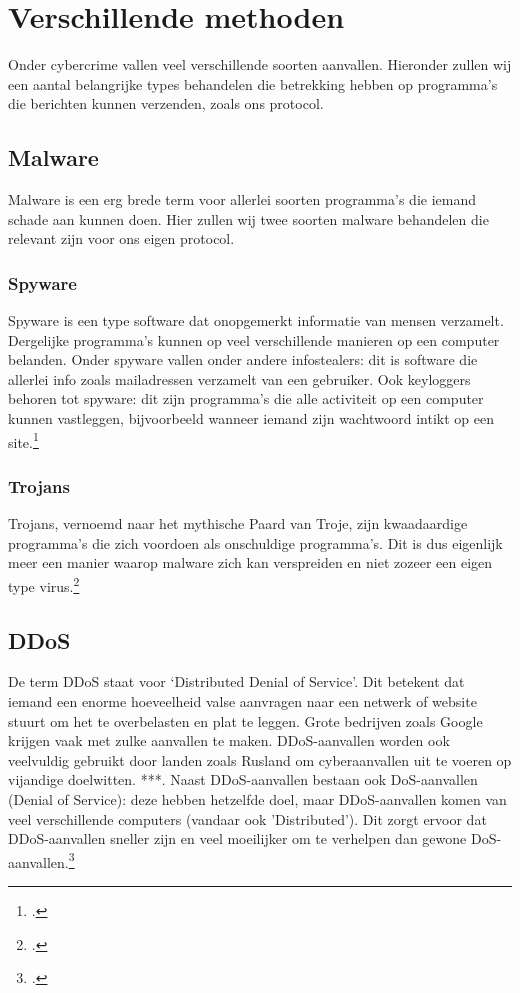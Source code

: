 \documentclass{report} %
\begin{document}
\section{Verschillende methoden}
Onder cybercrime vallen veel verschillende soorten aanvallen. Hieronder zullen wij een aantal belangrijke types behandelen die betrekking hebben op programma's die berichten kunnen verzenden, zoals ons protocol.

\subsection{Malware}
Malware is een erg brede term voor allerlei soorten programma's die iemand schade aan kunnen doen. Hier zullen wij twee soorten malware behandelen die relevant zijn voor ons eigen protocol.
\subsubsection{Spyware}
Spyware is een type software dat onopgemerkt informatie van mensen verzamelt. Dergelijke programma's kunnen op veel verschillende manieren op een computer belanden. Onder spyware vallen onder andere infostealers: dit is software die allerlei info zoals mailadressen verzamelt van een gebruiker. Ook keyloggers behoren tot spyware: dit zijn programma's die alle activiteit op een computer kunnen vastleggen, bijvoorbeeld wanneer iemand zijn wachtwoord intikt op een site.\footnote{\cite{spyware}.}
\subsubsection{Trojans}
Trojans, vernoemd naar het mythische Paard van Troje, zijn kwaadaardige programma's die zich voordoen als onschuldige programma's. Dit is dus eigenlijk meer een manier waarop malware zich kan verspreiden en niet zozeer een eigen type virus.\footnote{\cite{trojan}.}

\subsection{DDoS}
De term DDoS staat voor ‘Distributed Denial of Service’. Dit betekent dat iemand een enorme hoeveelheid valse aanvragen naar een netwerk of website stuurt om het te overbelasten en plat te leggen. Grote bedrijven zoals Google krijgen vaak met zulke aanvallen te maken. DDoS-aanvallen worden ook veelvuldig gebruikt door landen zoals Rusland om cyberaanvallen uit te voeren op vijandige doelwitten. ***. Naast DDoS-aanvallen bestaan ook DoS-aanvallen (Denial of Service): deze hebben hetzelfde doel, maar DDoS-aanvallen komen van veel verschillende computers (vandaar ook 'Distributed'). Dit zorgt ervoor dat DDoS-aanvallen sneller zijn en veel moeilijker om te verhelpen dan gewone DoS-aanvallen.\footnote{\cite{cybercrowdstrike}.}
\end{document}
